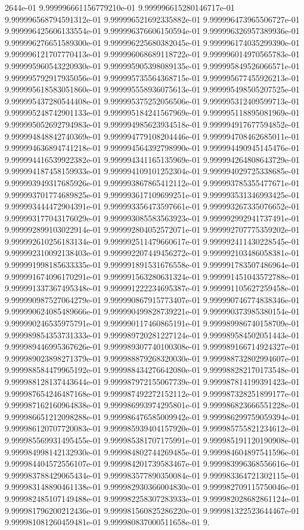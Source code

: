 2644e-01	9.999996661156779210e-01	9.999996615280146717e-01	9.999996568794591312e-01	9.999996521692335882e-01	9.999996473965506727e-01	9.999996425606133554e-01	9.999996376606150594e-01	9.999996326957389936e-01	9.999996276651589300e-01	9.999996225680382045e-01	9.999996174035299390e-01	9.999996121707770413e-01	9.999996068689118722e-01	9.999996014970565783e-01	9.999995960543220930e-01	9.999995905398089135e-01	9.999995849526066571e-01	9.999995792917935056e-01	9.999995735564368715e-01	9.999995677455926213e-01	9.999995618583051860e-01	9.999995558936075613e-01	9.999995498505207525e-01	9.999995437280544408e-01	9.999995375252056506e-01	9.999995312409599713e-01	9.999995248742901133e-01	9.999995184241567969e-01	9.999995118895081969e-01	9.999995052692794983e-01	9.999994985623934518e-01	9.999994917677594852e-01	9.999994848842740369e-01	9.999994779108204446e-01	9.999994708462685011e-01	9.999994636894741218e-01	9.999994564392798990e-01	9.999994490945145476e-01	9.999994416539922382e-01	9.999994341165135969e-01	9.999994264808643729e-01	9.999994187458159933e-01	9.999994109101252304e-01	9.999994029725338685e-01	9.999993949317685926e-01	9.999993867865412112e-01	9.999993785355477671e-01	9.999993701774689825e-01	9.999993617109699251e-01	9.999993531346993425e-01	9.999993444472904391e-01	9.999993356473597661e-01	9.999993267335076652e-01	9.999993177043176029e-01	9.999993085583563923e-01	9.999992992941737491e-01	9.999992899103022914e-01	9.999992804052572071e-01	9.999992707775359202e-01	9.999992610256183134e-01	9.999992511479660617e-01	9.999992411430228545e-01	9.999992310092138403e-01	9.999992207449456272e-01	9.999992103486058381e-01	9.999991998185633335e-01	9.999991891531676558e-01	9.999991783507486964e-01	9.999991674096170291e-01	9.999991563280631324e-01	9.999991451043572788e-01	9.999991337367495348e-01	9.999991222234695387e-01	9.999991105627259458e-01	9.999990987527064279e-01	9.999990867915773407e-01	9.999990746774838346e-01	9.999990624085489666e-01	9.999990499828739221e-01	9.999990373985380154e-01	9.999990246535975791e-01	9.999990117460865191e-01	9.999989986740158709e-01	9.999989854353731333e-01	9.999989720281227124e-01	9.999989584502051443e-01	9.999989446995367626e-01	9.999989307740100308e-01	9.999989166714924327e-01	9.999989023898271379e-01	9.999988879268320030e-01	9.999988732802994607e-01	9.999988584479965192e-01	9.999988434276642080e-01	9.999988282170173548e-01	9.999988128137443644e-01	9.999987972155067739e-01	9.999987814199391423e-01	9.999987654246487168e-01	9.999987492272152112e-01	9.999987328251899177e-01	9.999987162160964838e-01	9.999986993974295801e-01	9.999986823666551228e-01	9.999986651212098288e-01	9.999986476585009942e-01	9.999986299759059394e-01	9.999986120707720083e-01	9.999985939404157920e-01	9.999985755821234612e-01	9.999985569931495455e-01	9.999985381707175991e-01	9.999985191120190908e-01	9.999984998142132930e-01	9.999984802744269485e-01	9.999984604897541596e-01	9.999984404572556107e-01	9.999984201739583467e-01	9.999983996368556616e-01	9.999983788429065434e-01	9.999983577890350084e-01	9.999983364721302115e-01	9.999983148890461138e-01	9.999982930366004830e-01	9.999982709115750046e-01	9.999982485107149488e-01	9.999982258307283933e-01	9.999982028682861124e-01	9.999981796200212436e-01	9.999981560825286220e-01	9.999981322523644467e-01	9.999981081260459481e-01	9.999980837000511658e-01	9.